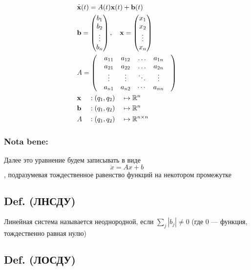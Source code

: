 \[\begin{aligned}
& \overset{\textbf .}{\mathbf x}(t) = A(t) \mathbf x(t) + \mathbf{b}(t) \\
& \mathbf b =
  \begin{pmatrix}
    b_1 \\
    b_2 \\
    \vdots \\
    b_n
    \end{pmatrix},\quad 
  \mathbf x =
  \begin{pmatrix}
    x_1 \\
    x_2 \\
    \vdots \\
    x_n
    \end{pmatrix} \\
& A = 
  \begin{pmatrix}
      & a_{1 1} & a_{1 2} & \ldots & a_{1 n} & \\
      & a_{2 1} & a_{2 2} & \ldots & a_{2 n}   \\
      & \vdots  & \vdots  & \ddots & \vdots    \\
      & a_{n 1} & a_{n 2} & \cdots & a_{n n}
      \end{pmatrix} \\
& \begin{aligned}
& \mathbf x &&: (q_1, q_2) && \mapsto \mathbb R^n \\
& \mathbf b &&: (q_1, q_2) && \mapsto \mathbb R^n \\
& A &&: (q_1, q_2) && \mapsto \mathbb R^{n\times n}
\end{aligned}
\end{aligned}\]

\subsubsection{Nota bene:}\label{nota-bene}

Далее это уравнение будем записывать в виде \[\dot x = A x + b\],
подразумевая тождественное равенство функций на некотором промежутке

\subsection{Def. (ЛНСДУ)}\label{def.-ux43bux43dux441ux434ux443}

Линейная система называется неоднородной, если \(\sum_j |b_j| \neq 0\)
(где \(0\) --- функция, тождественно равная нулю)

\subsection{Def. (ЛОСДУ)}\label{def.-ux43bux43eux441ux434ux443}

